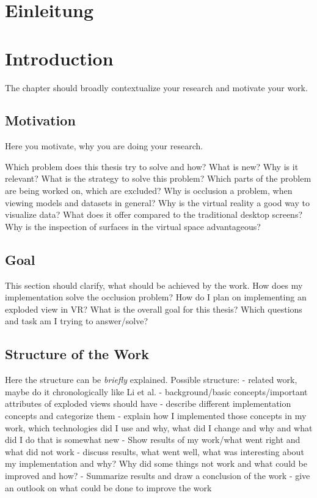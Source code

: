 {\chapter{Einleitung}}
{\chapter{Introduction}}

\label{sec:introduction}
The chapter should broadly contextualize your research and motivate your work.

\section{Motivation}
Here you motivate, why you are doing your research.

Which problem does this thesis try to solve and how? What is new? Why is it relevant? What is the strategy to solve this problem? Which parts of the problem are  being worked on, which are excluded? 
Why is occlusion a problem, when viewing models and datasets in general? 
Why is the virtual reality a good way to visualize data? What does it offer compared to the traditional desktop screens?
Why is the inspection of surfaces in the virtual space advantageous?

\section{Goal}
This section should clarify, what should be achieved by the work.
How does my implementation solve the occlusion problem?
How do I plan on implementing an exploded view in VR? What is the overall goal for this thesis?
Which questions and task am I trying to answer/solve?

\section{Structure of the Work}
Here the structure can be \emph{briefly} explained.
Possible structure:
- related work, maybe do it chronologically  like Li et al. 
- background/basic concepts/important attributes of exploded views should have
- describe different implementation concepts and categorize them
- explain how I implemented those concepts in my work, which technologies did I use and why, what did I change and why and what did I do that is somewhat new
- Show results of my work/what went right and what did not work
- discuss results, what went well, what was interesting about my implementation and why? Why did some things not work and what could be improved and how? 
- Summarize results and draw a conclusion of the work 
- give an outlook on what could be done to improve the work


